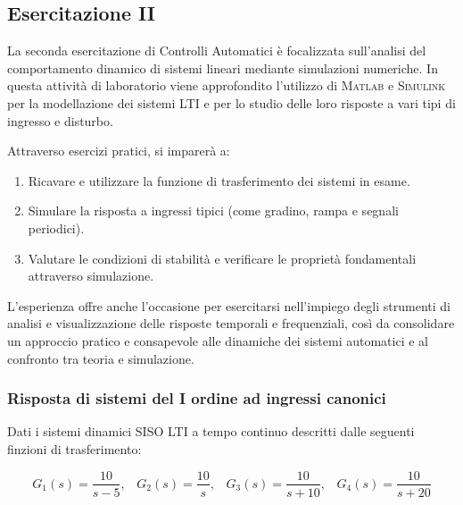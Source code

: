 \documentclass[../main.tex]{subfiles}
\begin{document}
\clearpage
\thispagestyle{empty}
\subsection{Esercitazione II}

La seconda esercitazione di Controlli Automatici è focalizzata sull’analisi del comportamento dinamico di sistemi lineari mediante simulazioni numeriche. In questa attività di laboratorio viene approfondito l’utilizzo di \textsc{Matlab} e \textsc{Simulink} per la modellazione dei sistemi LTI e per lo studio delle loro risposte a vari tipi di ingresso e disturbo.

Attraverso esercizi pratici, si imparerà a:

\begin{enumerate}
	\item[\textbf{-}] Ricavare e utilizzare la funzione di trasferimento dei sistemi in esame.
	\item[\textbf{-}] Simulare la risposta a ingressi tipici (come gradino, rampa e segnali periodici).
	\item[\textbf{-}] Valutare le condizioni di stabilità e verificare le proprietà fondamentali attraverso simulazione.
\end{enumerate}

L’esperienza offre anche l’occasione per esercitarsi nell’impiego degli strumenti di analisi e visualizzazione delle risposte temporali e frequenziali, così da consolidare un approccio pratico e consapevole alle dinamiche dei sistemi automatici e al confronto tra teoria e simulazione.

\vspace*{1cm}
\subsubsection{Risposta di sistemi del I ordine ad ingressi canonici}
\label{lab21}

Dati i sistemi dinamici SISO LTI a tempo continuo descritti dalle seguenti finzioni di trasferimento:

\begin{equation}	
	G_1(s) = \frac{10}{s - 5}, \hspace{10pt} G_2(s) = \frac{10}{s}, \hspace{10pt} 	G_3(s) = \frac{10}{s+10}, \hspace{10pt} G_4(s) = \frac{10}{s+20} 
\end{equation}
\end{document}
